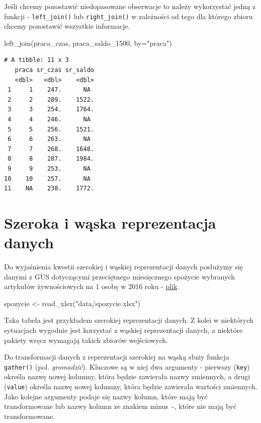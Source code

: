 \documentclass[
  letterpaper,
  DIV=11,
  numbers=noendperiod]{scrreprt}
\newenvironment{Shaded}{\begin{snugshade}}{\end{snugshade}}
\newcommand{\AttributeTok}[1]{\textcolor[rgb]{0.40,0.45,0.13}{#1}}
\newcommand{\FunctionTok}[1]{\textcolor[rgb]{0.28,0.35,0.67}{#1}}
\newcommand{\NormalTok}[1]{\textcolor[rgb]{0.00,0.23,0.31}{#1}}
\newcommand{\OtherTok}[1]{\textcolor[rgb]{0.00,0.23,0.31}{#1}}
\newcommand{\StringTok}[1]{\textcolor[rgb]{0.13,0.47,0.30}{#1}}
\begin{document}
Jeśli chcemy pozostawić niedopasowane obserwacje to należy wykorzystać
jedną z funkcji - \texttt{left\_join()} lub \texttt{right\_join()} w
zależności od tego dla którego zbioru chcemy pozostawić wszystkie
informacje.

\begin{Shaded}
\begin{Highlighting}[]
\FunctionTok{left\_join}\NormalTok{(praca\_czas, praca\_saldo\_1500, }\AttributeTok{by=}\StringTok{"praca"}\NormalTok{)}
\end{Highlighting}
\end{Shaded}

\begin{verbatim}
# A tibble: 11 x 3
   praca sr_czas sr_saldo
   <dbl>   <dbl>    <dbl>
 1     1    247.      NA 
 2     2    289.    1522.
 3     3    254.    1764.
 4     4    246.      NA 
 5     5    256.    1521.
 6     6    263.      NA 
 7     7    268.    1648.
 8     8    287.    1984.
 9     9    253.      NA 
10    10    257.      NA 
11    NA    238.    1772.
\end{verbatim}

\hypertarget{szeroka-i-wux105ska-reprezentacja-danych}{%
\section{Szeroka i wąska reprezentacja
danych}\label{szeroka-i-wux105ska-reprezentacja-danych}}

Do wyjaśnienia kwestii szerokiej i wąskiej reprezentacji danych
posłużymy się danymi z GUS dotyczącymi przeciętnego miesięcznego
spożycie wybranych artykułów żywnościowych na 1 osobę w 2016 roku -
\href{data/spozycie.xlsx}{plik}.

\begin{Shaded}
\begin{Highlighting}[]
\NormalTok{spozycie }\OtherTok{\textless{}{-}} \FunctionTok{read\_xlsx}\NormalTok{(}\StringTok{"data/spozycie.xlsx"}\NormalTok{)}
\end{Highlighting}
\end{Shaded}

Taka tabela jest przykładem szerokiej reprezentacji danych. Z kolei w
niektórych sytuacjach wygodnie jest korzystać z wąskiej reprezentacji
danych, a niektóre pakiety wręcz wymagają takich zbiorów wejściowych.

Do transformacji danych z reprezentacji szerokiej na wąską służy funkcja
\texttt{gather()} (pol. \emph{gromadzić}). Kluczowe są w niej dwa
argumenty - pierwszy (\texttt{key}) określa nazwę nowej kolumny, która
będzie zawierała nazwy zmiennych, a drugi (\texttt{value}) określa nazwę
nowej kolumny, która będzie zawierała wartości zmiennych. Jako kolejne
argumenty podaje się nazwy kolumn, które mają być transformowane lub
nazwy kolumn ze znakiem minus \texttt{-}, które nie mają być
transformowane.
\end{document}
